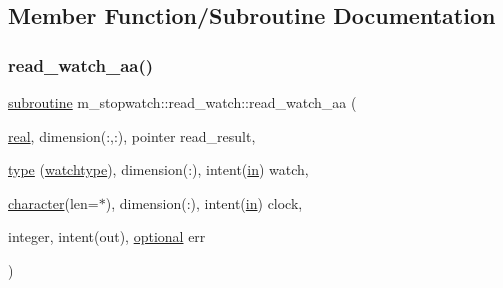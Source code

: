 \subsection{Member Function/\+Subroutine Documentation}
\mbox{\label{interfacem__stopwatch_1_1read__watch_a01c2b86754ccb62e2277b9939ef62f71}} 
\subsubsection{\texorpdfstring{read\+\_\+watch\+\_\+aa()}{read\_watch\_aa()}}
{\footnotesize\ttfamily \hyperlink{M__stopwatch_83_8txt_acfbcff50169d691ff02d4a123ed70482}{subroutine} m\+\_\+stopwatch\+::read\+\_\+watch\+::read\+\_\+watch\+\_\+aa (\begin{DoxyParamCaption}\item[{\hyperlink{read__watch_83_8txt_abdb62bde002f38ef75f810d3a905a823}{real}, dimension(\+:,\+:), pointer}]{read\+\_\+result,  }\item[{\hyperlink{stop__watch_83_8txt_a70f0ead91c32e25323c03265aa302c1c}{type} (\hyperlink{structm__stopwatch_1_1watchtype}{watchtype}), dimension(\+:), intent(\hyperlink{M__journal_83_8txt_afce72651d1eed785a2132bee863b2f38}{in})}]{watch,  }\item[{\hyperlink{option__stopwatch_83_8txt_abd4b21fbbd175834027b5224bfe97e66}{character}(len=$\ast$), dimension(\+:), intent(\hyperlink{M__journal_83_8txt_afce72651d1eed785a2132bee863b2f38}{in})}]{clock,  }\item[{integer, intent(out), \hyperlink{option__stopwatch_83_8txt_aa4ece75e7acf58a4843f70fe18c3ade5}{optional}}]{err }\end{DoxyParamCaption})\hspace{0.3cm}{\ttfamily [private]}}

\mbox{\label{interfacem__stopwatch_1_1read__watch_ac1b013c2331a6ee1e13f31d7c7da59de}} 
